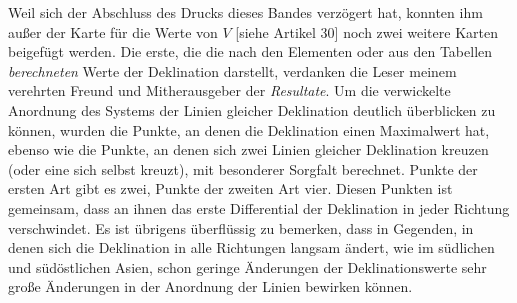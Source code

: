Weil sich der Abschluss des Drucks dieses Bandes verzögert hat, konnten ihm außer der Karte für die Werte von $V$ [siehe Artikel 30] noch zwei weitere Karten beigefügt werden. Die erste, die die nach den Elementen oder aus den Tabellen \textit{berechneten} Werte der Deklination darstellt, verdanken die Leser meinem verehrten Freund und Mitherausgeber der \textit{Resultate}. Um die verwickelte Anordnung des Systems der Linien gleicher Deklination deutlich überblicken zu können, wurden die Punkte, an denen die Deklination einen Maximalwert hat, ebenso wie die Punkte, an denen sich zwei Linien gleicher Deklination kreuzen (oder eine sich selbst kreuzt), mit besonderer Sorgfalt berechnet. Punkte der ersten Art gibt es zwei, Punkte der zweiten Art vier. Diesen Punkten ist gemeinsam, dass an ihnen das erste Differential der Deklination in jeder Richtung verschwindet. Es ist übrigens überflüssig zu bemerken, dass in Gegenden, in denen sich die Deklination in alle Richtungen langsam ändert, wie im südlichen und südöstlichen Asien, schon geringe Änderungen der Deklinationswerte sehr große Änderungen in der Anordnung der Linien bewirken können.
